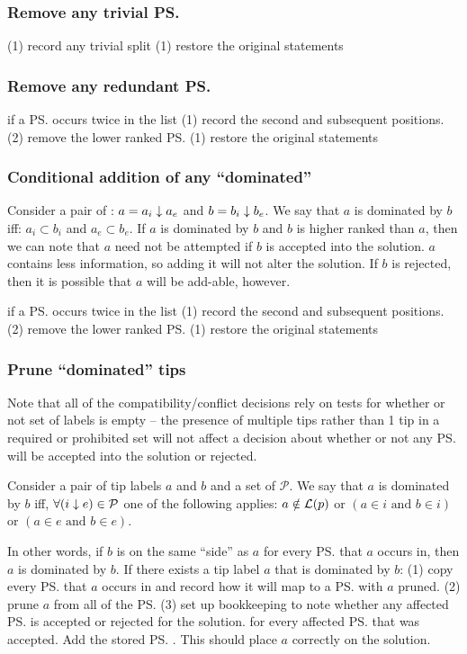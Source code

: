\documentclass[11pt]{article}
\begin{document}
\subsubsection{Remove any trivial \ps}
\simplification (1) record any trivial split
\undoActions (1) restore the original statements

\subsubsection{Remove any redundant \ps}
\simplification if a \ps occurs twice in the list (1) record the second and subsequent positions. (2) remove the lower ranked \ps
\undoActions (1) restore the original statements

\subsubsection{Conditional addition of any ``dominated'' \pss}
Consider a pair of \pss: $a={a_i}\downarrow{a_e}$ and $b={b_i}\downarrow{b_e}$.
We say that $a$ is dominated by $b$ iff: 
    $a_i \subset b_i$ and $a_e\subset b_e$.
If $a$ is dominated by $b$ and $b$ is higher ranked than $a$, then we can 
    note that $a$ need not be attempted if $b$ is accepted into the solution.
$a$ contains less information, so adding it will not alter the solution.
If $b$ is rejected, then it is possible that $a$ will be add-able, however.


\simplification if a \ps occurs twice in the list (1) record the second and subsequent positions. (2) remove the lower ranked \ps
\undoActions (1) restore the original statements

\subsubsection{Prune ``dominated'' tips}
Note that all of the compatibility/conflict decisions rely on tests for whether or not
    set of labels is empty -- the presence of multiple tips rather than 1 tip in a
    required or prohibited set will not affect a decision about whether or not any
    \ps will be accepted into the solution or rejected.

Consider a pair of tip labels $a$ and $b$ and a set of \pss $\mathcal{P}$.
We say that $a$ is dominated by $b$ iff, $\forall ({i}\downarrow{e}) \in \mathcal{P}$ one of the 
    following applies:
    $a\notin \mathcal{L}(p)$
    or $(a \in i \mbox{ and } b \in i)$
    or $(a \in e \mbox{ and } b \in e)$.

In other words, if $b$ is on the same ``side'' as $a$ for every \ps that $a$ occurs in, then
 $a$ is dominated by $b$.
 \simplification  If there exists a tip label $a$ that is dominated by $b$:
    (1) copy every \ps that $a$ occurs in and record how it will map to a \ps with $a$ pruned.
    (2) prune $a$ from all of the \ps
    (3) set up bookkeeping to note whether any affected \ps is accepted or rejected for the solution.
\undoActions for every affected \ps that was accepted. Add the stored \ps. This should place $a$ correctly on the solution.
\end{document}
